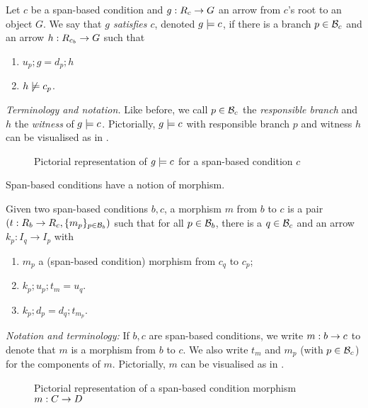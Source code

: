 \begin{definition}
  Let $c$ be a span-based condition and $g:R_c\rightarrow G$ an arrow from $c$'s root to an object $G$. We say that \emph{$g$ satisfies $c$}, denoted $g\models c$, if there is a branch $p\in \mathcal{B}_c$ and an arrow $h:R_{c_b}\rightarrow G$ such that
  \begin{enumerate}
  \item $u_p;g=d_p;h$
  \item $h\not\models c_p$.
  \end{enumerate}
\end{definition}
%
\emph{Terminology and notation.} Like before, we call $p\in\mathcal{B}_c$ the \emph{responsible branch} and $h$ the \emph{witness} of $g\models c$. Pictorially, $g\models c$ with responsible branch $p$ and witness $h$ can be visualised as in .
%
\begin{figure}
  \centering
  
  \caption{Pictorial representation of $g\models c$ for a span-based condition $c$}
\end{figure}

\medskip\noindent
Span-based conditions have a notion of morphism.

\begin{definition}
  Given two span-based conditions $b,c$, a morphism $m$ from $b$ to $c$ is a pair $(t:R_b\rightarrow R_c,\{{m_p}\}_{p\in \mathcal{B}_b})$ such that for all $p\in \mathcal{B}_b$, there is a $q\in \mathcal{B}_c$ and an arrow $k_p:I_q\rightarrow I_p$ with
  \begin{enumerate}
  \item $m_p$ a (span-based condition) morphism from $c_q$ to $c_p$;
  \item $k_p;u_p;t_m=u_q$.
  \item $k_p;d_p=d_q;t_{m_p}$.
  \end{enumerate}
\end{definition}
%
\emph{Notation and terminology:} If $b,c$ are span-based conditions, we write $m:b\rightarrow c$ to denote that $m$ is a morphism from $b$ to $c$. We also write $t_m$ and $m_p$ (with $p\in\mathcal{B}_c$) for the components of $m$. Pictorially, $m$ can be visualised as in .
%
\begin{figure}
  \centering
  
  \caption{Pictorial representation of a span-based condition morphism $m:C\rightarrow D$}
\end{figure}

